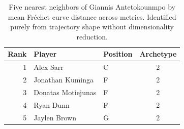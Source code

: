\begin{table}[htbp]
  \centering\small
  \begin{tabular}{rllc}
    \toprule
    Rank & Player & Position & Archetype \\
    \midrule
    1 & Alex Sarr & C & 2 \\
    2 & Jonathan Kuminga & F & 2 \\
    3 & Donatas Motiejunas & F & 2 \\
    4 & Ryan Dunn & F & 2 \\
    5 & Jaylen Brown & G & 2 \\
    \bottomrule
  \end{tabular}
  \caption{Five nearest neighbors of Giannis Antetokounmpo by mean Fr\'{e}chet curve distance across metrics. Identified purely from trajectory shape without dimensionality reduction.}
  \label{tab:Giannis_Antetokounmpo_frechet_curve_neighbors}
\end{table}

